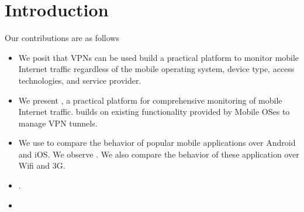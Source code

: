 \section{Introduction}
\label{sec:introduction}


Our contributions are as follows
\begin{itemize}
\item We posit that VPNs can be used build a practical platform to monitor mobile Internet traffic regardless of the mobile operating system, device type, access technologies, and service provider.
\item We present \platname, a practical platform for comprehensive monitoring of mobile Internet traffic. 
\platname builds on existing functionality provided by Mobile OSes to manage VPN tunnels. 
\item We use \platname to compare the behavior of popular mobile applications over Android and iOS. We observe . We also compare the behavior of these application over Wifi and 3G. 
\item {}.
\item {}
\end{itemize}






